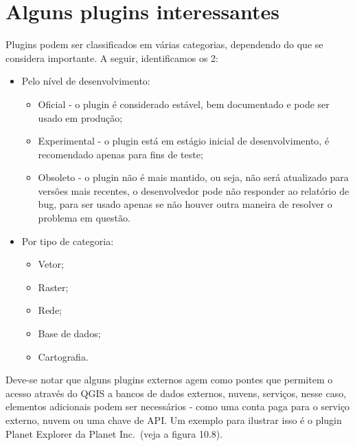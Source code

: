 \documentclass[
]{krantz}
\providecommand{\tightlist}{%
  \setlength{\itemsep}{0pt}\setlength{\parskip}{0pt}}
\begin{document}
\hypertarget{alguns-plugins-interessantes}{%
\section{Alguns plugins interessantes}\label{alguns-plugins-interessantes}}

Plugins podem ser classificados em várias categorias, dependendo do que se considera importante. A seguir, identificamos os 2:

\begin{itemize}
\tightlist
\item
  Pelo nível de desenvolvimento:

  \begin{itemize}
  \tightlist
  \item
    Oficial - o plugin é considerado estável, bem documentado e pode ser usado em produção;
  \item
    Experimental - o plugin está em estágio inicial de desenvolvimento, é recomendado apenas para fins de teste;
  \item
    Obsoleto - o plugin não é mais mantido, ou seja, não será atualizado para versões mais recentes, o desenvolvedor pode não responder ao relatório de bug, para ser usado apenas se não houver outra maneira de resolver o problema em questão.
  \end{itemize}
\item
  Por tipo de categoria:

  \begin{itemize}
  \tightlist
  \item
    Vetor;
  \item
    Raster;
  \item
    Rede;
  \item
    Base de dados;
  \item
    Cartografia.
  \end{itemize}
\end{itemize}

Deve-se notar que alguns plugins externos agem como pontes que permitem o acesso através do QGIS a bancos de dados externos, nuvens, serviços, nesse caso, elementos adicionais podem ser necessários - como uma conta paga para o serviço externo, nuvem ou uma chave de API. Um exemplo para ilustrar isso é o plugin Planet Explorer da Planet Inc.~(veja a figura 10.8).
\end{document}

